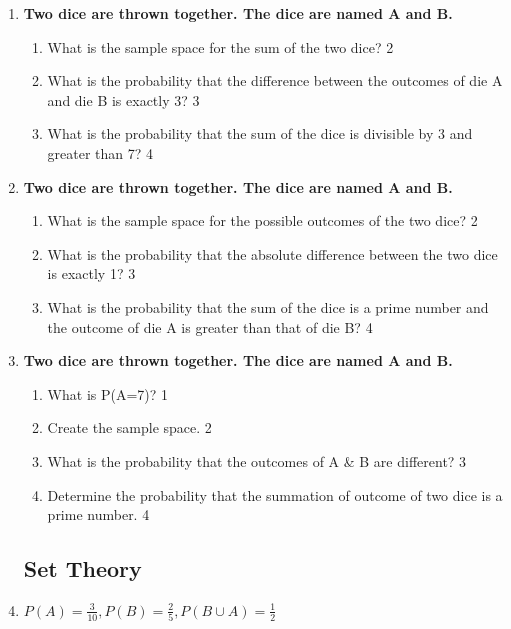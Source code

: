 \documentclass[a4paper,oneside, margin=1.4in]{book}
\begin{document}
\begin{enumerate}
  \item  
  \textbf{Two dice are thrown together. The dice are named A and B.}  

  \begin{enumerate}  
    \item  
    	What is the sample space for the sum of the two dice? \hfill 2  
    \item  
    	What is the probability that the difference between the outcomes of die A and die B is exactly 3? \hfill 3  
    \item  
    	What is the probability that the sum of the dice is divisible by 3 and greater than 7? \hfill 4  
  \end{enumerate}  

  
  \item  
  \textbf{Two dice are thrown together. The dice are named A and B.}  

  \begin{enumerate}  
    \item  
    	What is the sample space for the possible outcomes of the two dice? \hfill 2  
    \item  
    	What is the probability that the absolute difference between the two dice is exactly 1? \hfill 3  
    \item  
    	What is the probability that the sum of the dice is a prime number and the outcome of die A is greater than that of die B? \hfill 4  
  \end{enumerate}  


 \item
	  \textbf{Two dice are thrown together. The dice are named A and B.} 
  
  \begin{enumerate}
    \item
	What is P(A=7)? \hfill 1
    \item
	Create the sample space. \hfill 2
    \item  
	What is the probability that the outcomes of A \& B are different? \hfill 3
    \item
	Determine the probability that the summation of outcome of two dice is a prime number. \hfill 4
  \end{enumerate}


\subsection{Set Theory}

 \item
	  \textbf{$P(A) = \frac{3}{10}, P(B) = \frac 25, P(B\cup A) = \frac12$} 
  

\end{enumerate}
\end{document}

